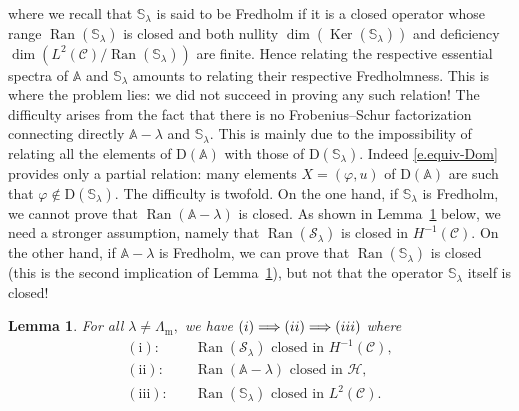 \documentclass[11pt]{article}
\newtheorem{lemm}[theo]{Lemma}
\theoremstyle{definition}
\numberwithin{equation}{section}
\numberwithin{figure}{section}
\numberwithin{table}{section}
\DeclareMathOperator{\Ker}{Ker}
\DeclareMathOperator{\Ran}{Ran}
\newcommand{\calC}{\mathcal{C}}
\newcommand{\calH}{\mathcal{H}}
\newcommand{\calS}{\mathcal{S}}
\newcommand{\bbA}{\mathbb{A}}
\newcommand{\bbS}{\mathbb{S}}
\newcommand{\rmD}{{\mathrm{D}}}
\newcommand{\Lm}{{\Lambda_{\mathrm{m}}}}
\begin{document}
where we recall that $\bbS_\lambda$ is said to be Fredholm if it is a closed operator whose range $\Ran(\bbS_\lambda)$ is closed and both nullity $\dim(\Ker(\bbS_\lambda))$ and deficiency $\dim(L^2(\calC)/\Ran(\bbS_\lambda))$ are finite. Hence relating the respective essential spectra of $\bbA$ and $\bbS_\lambda$ amounts to relating their respective Fredholmness. This is where the problem lies: we did not succeed in proving any such relation! The difficulty arises from the fact that there is no Frobenius--Schur factorization connecting directly $\bbA - \lambda$ and $\bbS_\lambda.$ This is mainly due to the impossibility of relating all the elements of $\rmD(\bbA)$ with those of $\rmD(\bbS_\lambda)$. Indeed \eqref{e.equiv-Dom} provides only a partial relation: many elements $X = (\varphi,u)$ of $\rmD(\bbA)$ are such that $\varphi \notin \rmD(\bbS_\lambda).$ The difficulty is twofold. On the one hand, if $\bbS_\lambda$ is Fredholm, we cannot prove that $\Ran(\bbA - \lambda)$ is closed. As shown in Lemma~\ref{l.ranges} below, we need a stronger assumption, namely that $\Ran(\calS_\lambda)$ is closed in $H^{-1}(\calC).$ On the other hand, if $\bbA - \lambda$ is Fredholm, we can prove that $\Ran(\bbS_\lambda)$ is closed (this is the second implication of Lemma~\ref{l.ranges}), but not that the operator $\bbS_\lambda$ itself is closed!


\begin{lemm}
For all $\lambda \neq \Lm,$ we have ${\rm (i)} \Longrightarrow {\rm (ii)} \Longrightarrow {\rm (iii)}$ where
\begin{align*}
\mathrm{(i)}: & \quad \Ran(\calS_\lambda) \text{ closed in } H^{-1}(\calC), \\
\mathrm{(ii)}: & \quad \Ran(\bbA - \lambda) \text{ closed in } \calH, \\
\mathrm{(iii)}: & \quad \Ran(\bbS_\lambda) \text{ closed in } L^2(\calC).
\end{align*}\label{l.ranges}
\end{lemm}
\end{document}
